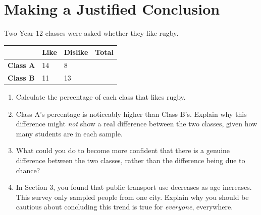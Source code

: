 \documentclass[11pt]{article}
\newcommand{\ans}{\hrulefill}
\newcommand{\anshere}{\par\vspace{0.3em}\noindent\ans\par\vspace{0.3em}}
\begin{document}
\section{Making a Justified Conclusion}
\noindent Two Year 12 classes were asked whether they like rugby.

\begin{center}
\begin{tabular}{|L|Y|Y|Y|}
\hline
 & \textbf{Like} & \textbf{Dislike} & \textbf{Total} \\\hline
\textbf{Class A} & 14 & 8  & \\\hline
\textbf{Class B} & 11 & 13 & \\\hline
\end{tabular}
\end{center}

\begin{enumerate}
  \item Calculate the percentage of each class that likes rugby.
  \anshere
  \item Class A's percentage is noticeably higher than Class B's. Explain why this
    difference might \emph{not} show a real difference between the two classes, given
    how many students are in each sample.
  \anshere
  \item What could you do to become more confident that there is a genuine difference
    between the two classes, rather than the difference being due to chance?
  \anshere
  \item In Section 3, you found that public transport use decreases as age increases.
    This survey only sampled people from one city. Explain why you should be cautious
    about concluding this trend is true for \emph{everyone}, everywhere.
  \anshere
\end{enumerate}
\end{document}
